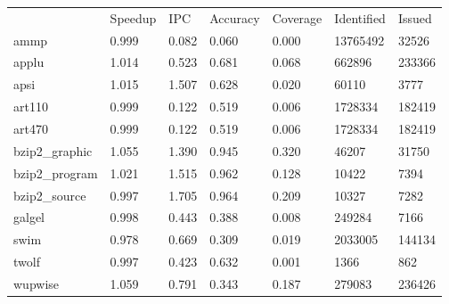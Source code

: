 \begin{tabular}{ l l l l l l l }
  		& Speedup & IPC & Accuracy & Coverage & Identified & Issued   \\
ammp 		& 0.999 & 0.082 & 0.060 & 0.000 & 13765492 & 32526\\
applu 		& 1.014 & 0.523 & 0.681 & 0.068 & 662896   & 233366\\
apsi 		& 1.015 & 1.507 & 0.628 & 0.020 & 60110    & 3777 \\	
art110 		& 0.999 & 0.122 & 0.519 & 0.006 & 1728334  & 182419 \\	
art470 		& 0.999 & 0.122 & 0.519 & 0.006 & 1728334  & 182419 	\\
bzip2_graphic 	& 1.055 & 1.390 & 0.945 & 0.320 & 46207    & 31750 	\\
bzip2_program 	& 1.021 & 1.515 & 0.962 & 0.128 & 10422    & 7394 	\\
bzip2_source 	& 0.997 & 1.705 & 0.964 & 0.209 & 10327    & 7282 	\\
galgel 		& 0.998 & 0.443 & 0.388 & 0.008 & 249284   & 7166 	\\
swim 		& 0.978 & 0.669 & 0.309 & 0.019 & 2033005  & 144134 	\\
twolf 		& 0.997 & 0.423 & 0.632 & 0.001 & 1366 	   & 862	\\
wupwise 	& 1.059 & 0.791 & 0.343 & 0.187 & 279083   & 236426 	\\
\end{tabular}


